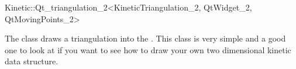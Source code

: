 

\begin{ccRefClass}{Kinetic::Qt_triangulation_2<KineticTriangulation_2, QtWidget_2, QtMovingPoints_2>}  %


\ccDefinition
  
The class draws a triangulation into the . This class is
very simple and a good one to look at if you want to see how to draw
your own two dimensional kinetic data structure.


\ccCreation
{}  %


\ccSeeAlso


\end{ccRefClass}


